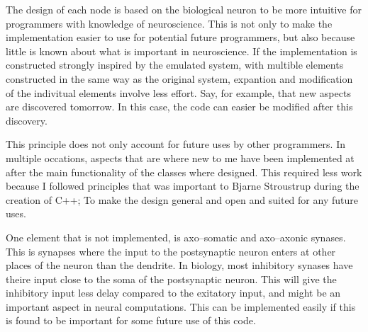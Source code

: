 The design of each node is based on the biological neuron to be more intuitive for programmers with knowledge of neuroscience. 
This is not only to make the implementation easier to use for potential future programmers, but also because little is known about what is important in neuroscience.
If the implementation is constructed strongly inspired by the emulated system, with multible elements constructed in the same way as the original system, expantion and modification of the indivitual elements involve less effort.
Say, for example, that new aspects are discovered tomorrow. In this case, the code can easier be modified after this discovery.

This principle does not only account for future uses by other programmers.
In multiple occations, aspects that are where new to me have been implemented at after the main functionality of the classes where designed. 
This required less work because I followed principles that was important to Bjarne Stroustrup during the creation of C++; To make the design general and open and suited for any future uses.%


One element that is not implemented, is axo--somatic and axo--axonic synases. 
This is synapses where the input to the postsynaptic neuron enters at other places of the neuron than the dendrite. 
In biology, most inhibitory synases have theire input close to the soma of the postsynaptic neuron. 
This will give the inhibitory input less delay compared to the exitatory input, and might be an important aspect in neural computations.
This can be implemented easily if this is found to be important for some future use of this code.

